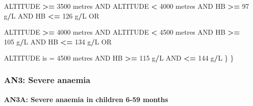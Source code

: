 \documentclass[12pt,a4paper]{article}
\newenvironment{Shaded}{\begin{snugshade}}{\end{snugshade}}
\newcommand{\DecValTok}[1]{\textcolor[rgb]{0.00,0.00,0.81}{#1}}
\newcommand{\NormalTok}[1]{#1}
\newcommand{\OperatorTok}[1]{\textcolor[rgb]{0.81,0.36,0.00}{\textbf{#1}}}
\newcommand{\StringTok}[1]{\textcolor[rgb]{0.31,0.60,0.02}{#1}}
\let\oldparagraph\paragraph
\renewcommand{\paragraph}[1]{\oldparagraph{#1}\mbox{}}
\begin{document}
\begin{Shaded}
\begin{Highlighting}[]
\NormalTok{        ALTITUDE }\OperatorTok{>=}\StringTok{ }\DecValTok{3500}\NormalTok{ metres AND ALTITUDE }\OperatorTok{<}\StringTok{ }\DecValTok{4000}\NormalTok{ metres AND }
\NormalTok{          HB }\OperatorTok{>=}\StringTok{ }\DecValTok{97}\NormalTok{ g}\OperatorTok{/}\NormalTok{L AND HB }\OperatorTok{<=}\StringTok{ }\DecValTok{126}\NormalTok{ g}\OperatorTok{/}\NormalTok{L OR}

\NormalTok{        ALTITUDE }\OperatorTok{>=}\StringTok{ }\DecValTok{4000}\NormalTok{ metres AND ALTITUDE }\OperatorTok{<}\StringTok{ }\DecValTok{4500}\NormalTok{ metres AND }
\NormalTok{          HB }\OperatorTok{>=}\StringTok{ }\DecValTok{105}\NormalTok{ g}\OperatorTok{/}\NormalTok{L AND HB }\OperatorTok{<=}\StringTok{ }\DecValTok{134}\NormalTok{ g}\OperatorTok{/}\NormalTok{L OR}

\NormalTok{        ALTITUDE is =}\StringTok{ }\DecValTok{4500}\NormalTok{ metres AND HB }\OperatorTok{>=}\StringTok{ }\DecValTok{115}\NormalTok{ g}\OperatorTok{/}\NormalTok{L AND }\OperatorTok{<=}\StringTok{ }\DecValTok{144}\NormalTok{ g}\OperatorTok{/}\NormalTok{L}
\NormalTok{      \}}
\NormalTok{  \}}
\end{Highlighting}
\end{Shaded}

\newpage

\hypertarget{an3-severe-anaemia}{%
\subsubsection{AN3: Severe anaemia}\label{an3-severe-anaemia}}

\hypertarget{an3a-severe-anaemia-in-children-6-59-months}{%
\paragraph{AN3A: Severe anaemia in children 6-59 months}\label{an3a-severe-anaemia-in-children-6-59-months}}
\end{document}
